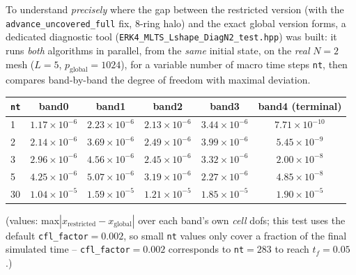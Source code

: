 \documentclass[11pt]{article}
\begin{document}
To understand \emph{precisely} where the gap between the restricted
version (with the \texttt{advance\_uncovered\_full} fix, 8-ring halo)
and the exact global version forms, a dedicated diagnostic tool
(\texttt{ERK4\_MLTS\_Lshape\_DiagN2\_test.hpp}) was built: it runs
\emph{both} algorithms in parallel, from the \emph{same} initial state,
on the \emph{real} $N=2$ mesh ($L=5$, $p_{\text{global}}=1024$), for a
variable number of macro time steps \texttt{nt}, then compares
band-by-band the degree of freedom with maximal deviation.

\begin{center}
\begin{tabular}{@{}lccccc@{}}
\toprule
\texttt{nt} & band0 & band1 & band2 & band3 & band4 (terminal) \\
\midrule
1  & $1.17\times10^{-6}$ & $2.23\times10^{-6}$ & $2.13\times10^{-6}$ & $3.44\times10^{-6}$ & $7.71\times10^{-10}$ \\
2  & $2.14\times10^{-6}$ & $3.69\times10^{-6}$ & $2.49\times10^{-6}$ & $3.99\times10^{-6}$ & $5.45\times10^{-9}$ \\
3  & $2.96\times10^{-6}$ & $4.56\times10^{-6}$ & $2.45\times10^{-6}$ & $3.32\times10^{-6}$ & $2.00\times10^{-8}$ \\
5  & $4.25\times10^{-6}$ & $5.07\times10^{-6}$ & $3.19\times10^{-6}$ & $2.27\times10^{-6}$ & $4.85\times10^{-8}$ \\
30 & $1.04\times10^{-5}$ & $1.59\times10^{-5}$ & $1.21\times10^{-5}$ & $1.85\times10^{-5}$ & $1.90\times10^{-5}$ \\
\bottomrule
\end{tabular}
\end{center}
(values: max$|x_{\text{restricted}} - x_{\text{global}}|$ over each
band's own \emph{cell} dofs; this test uses the default
\texttt{cfl\_factor}$=0.002$, so small \texttt{nt} values only cover a
fraction of the final simulated time -- \texttt{cfl\_factor}$=0.002$
corresponds to \texttt{nt}$=283$ to reach $t_f=0.05$.)
\end{document}
